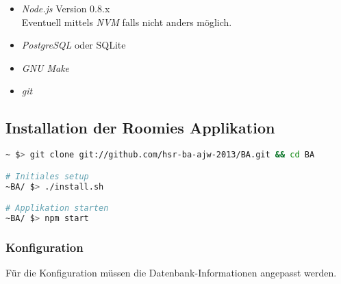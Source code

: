 \begin{itemize}
	\item \emph{Node.js} Version 0.8.x \cite{nodejs}\\
		Eventuell mittels \emph{NVM} \cite{NVM} falls nicht anders möglich.
	\item \emph{PostgreSQL} \cite{PostgreSQL} oder SQLite \cite{SQLite}
	\item \emph{GNU Make} \cite{GNUmake}
	\item \emph{git} \cite{git}
\end{itemize}

\subsection*{Installation der Roomies Applikation}

\begin{lstlisting}[language=Bash, caption=Installationsanleitung ohne Vagrant]
~ $> git clone git://github.com/hsr-ba-ajw-2013/BA.git && cd BA

# Initiales setup
~BA/ $> ./install.sh

# Applikation starten
~BA/ $> npm start
\end{lstlisting}

\subsubsection*{Konfiguration}
Für die Konfiguration müssen die Datenbank-Informationen angepasst werden.